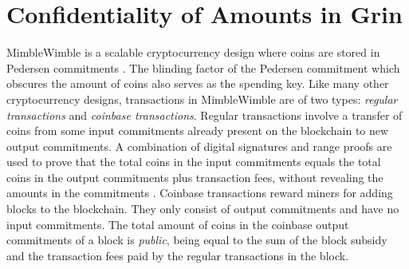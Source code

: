 \chapter{Confidentiality of Amounts in Grin}
\label{chap:grin-ub}

\newcommand{\amt}{\mathfrak{a}}
\newcommand{\rew}{\textit{reward}}
\newcommand{\fees}{\textit{fees}}



MimbleWimble \cite{MimbleWimbleWhitePaper} is a scalable cryptocurrency design where coins are stored in Pedersen commitments \cite{Pedersen91}. 
The blinding factor of the Pedersen commitment which obscures the amount of coins also serves as the spending key. 
Like many other cryptocurrency designs, transactions in MimbleWimble are of two types: \textit{regular transactions} and \textit{coinbase transactions}. 
Regular transactions involve a transfer of coins from some input commitments already present on the blockchain to new output commitments. 
A combination of digital signatures and range proofs are used to prove that the total coins in the input commitments equals the total coins in the output commitments plus transaction fees, without revealing the amounts in the commitments \cite{GrinDocOnGithub}. 
Coinbase transactions reward miners for adding blocks to the blockchain. 
They only consist of output commitments and have no input commitments. 
The total amount of coins in the coinbase output commitments of a block is \textit{public}, being equal to the sum of the block subsidy and the transaction fees paid by the regular transactions in the block.

